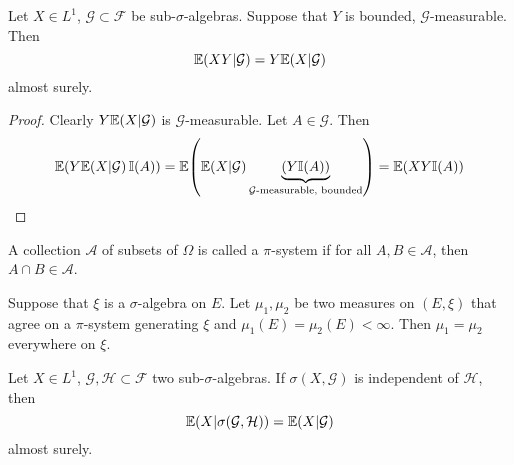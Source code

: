 \begin{proposition}
  Let $X \in L^{1}$, $\mathcal{G} \subset \mathcal{F}$ be
  sub-$\sigma$-algebras.  Suppose that $Y$ is bounded,
  $\mathcal{G}$-measurable.  Then
  \begin{equation}
    \label{eq:14}
    \E{XY | \mathcal{G}} = Y \E{X | \mathcal{G}}
  \end{equation} almost surely.
\end{proposition}

\begin{proof}
  Clearly $Y \E{X|\mathcal{G}}$ is $\mathcal{G}$-measurable.  Let $A
\in \mathcal{G}$.  Then
\begin{equation}
  \label{eq:15}
  \E{Y \E{X | \mathcal{G}} \I{A}} = \E{\E{X | \mathcal{G}}
    \underbrace{(Y \I{A})}_{\text{$\mathcal{G}$-measurable, bounded}}}
  = \E{XY \I{A}}
\end{equation}
\end{proof}

\begin{defn}
  \label{defn:inequalities:1}
  A collection $\mathcal{A}$ of subsets of $\Omega$ is called a
  $\pi$-system if for all $A, B \in \mathcal{A}$, then $A \cap B \in
  \mathcal{A}$.
\end{defn}

\begin{proposition} Suppose that $\xi$ is a
  $\sigma$-algebra on $E$.  Let $\mu_{1}, \mu_{2}$ be two measures on
  $(E, \xi)$ that agree on a $\pi$-system generating $\xi$ and
  $\mu_{1}(E) = \mu_{2}(E) < \infty$.  Then $\mu_{1} = \mu_{2}$
  everywhere on $\xi$.
\end{proposition}

\begin{thm}
  \label{defn:inequalities:2}
  Let $X \in L^{1}$, $\mathcal{G}, \mathcal{H} \subset \mathcal{F}$
  two sub-$\sigma$-algebras.  If $\sigma(X, \mathcal{G})$ is
  independent of $\mathcal{H}$, then
  \begin{equation}
    \label{eq:17}
    \E{X| \sigma(\mathcal{G}, \mathcal{H})} = \E{X | \mathcal{G}}
  \end{equation} almost surely.
\end{thm}

